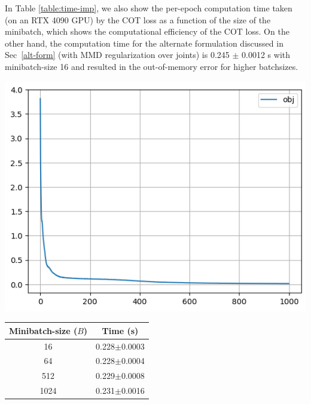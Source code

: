 In Table \ref{table:time-imp}, we also show the per-epoch computation time taken (on an RTX 4090 GPU) by the COT loss as a function of the size of the minibatch, which shows the computational efficiency of the COT loss. On the other hand, the computation time for the alternate formulation discussed in Sec~\ref{alt-form} (with MMD regularization over joints) is 0.245 $\pm$ 0.0012 s with minibatch-size 16 and resulted in the out-of-memory error for higher batchsizes.


\begin{minipage}{\textwidth}

  \begin{minipage}[b]{0.4\textwidth}
    \centering
    \includegraphics[scale=0.35]{chapter-3/images/obj.png}
  \end{minipage}
\hfill
\begin{minipage}[b]{0.6\textwidth}
\centering
      \begin{tabular}{cc}
        \toprule
          Minibatch-size ($B$) & Time (s) \\  
        \midrule
         16 & 0.228$\pm$0.0003\\
         64 & 0.228$\pm$0.0004\\
         512 & 0.229$\pm$0.0008\\
         1024 & 0.231$\pm$0.0016 \\
        \bottomrule 
        \end{tabular}
      \label{table:time-imp}
    \end{minipage}
\end{minipage}

